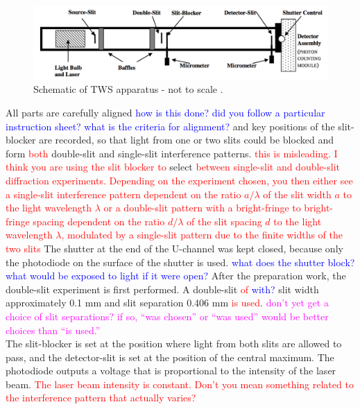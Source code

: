 \documentclass[prb,preprint]{revtex4-1}
\begin{document}
\begin{figure}[h!]
\centering
\includegraphics[width=7in]{dia}
\caption{Schematic of TWS apparatus - not to scale \cite{dia}.}
\label{dia}
\end{figure}
All parts are carefully aligned \textcolor{blue}{how is this done? did you follow a particular instruction sheet? what is the criteria for alignment?} and key positions of the slit-blocker are recorded, so that light from one or two slits could be blocked and form \textcolor{red}{both} double-slit and single-slit interference patterns. \textcolor{red}{this is misleading. I think you are using the slit blocker to} select \textcolor{red}{between single-slit and double-slit diffraction experiments. Depending on the experiment chosen, you then either see a single-slit interference pattern dependent on the ratio $a/\lambda$ of the slit width $a$ to the light wavelength $\lambda$ or a double-slit pattern    with a bright-fringe to bright-fringe spacing dependent on the ratio $d/\lambda$ of the slit spacing $d$ to the light wavelength $\lambda$, modulated by a single-slit pattern due to the finite widths of the two slits } The shutter at the end of the U-channel was kept closed, because only the photodiode on the surface of the shutter is used. \textcolor{blue}{what does the shutter block? what would be exposed to light if it were open?} After the preparation work, the double-slit experiment is first performed. A double-slit \textcolor{red}{of} \textcolor{blue}{with?} slit width approximately 0.1 mm and slit separation 0.406 mm \textcolor{red}{is used}. \textcolor{magenta}{don't yet get a choice of slit separations? if so, ``was chosen'' or ``was used'' would be  better choices than ``is used.''}  \\

The slit-blocker is set at the position where light from both slits are allowed to pass, and the detector-slit is set at the position of the central maximum. The photodiode outputs a voltage that is proportional to the intensity of the laser beam. \textcolor{red}{The laser beam intensity is constant. Don't you mean something related to the interference pattern that actually varies?}\\ 
\end{document}
